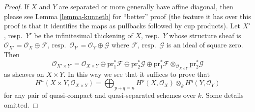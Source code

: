 \begin{proof}
If $X$ and $Y$ are separated or more generally have affine diagonal, then
please see Lemma \ref{lemma-kunneth} for ``better'' proof
(the feature it has over this proof is that it identifies the
maps as pullbacks followed by cup products).
Let $X'$, resp.\ $Y'$ be the infinitesimal thickening of $X$, resp.\ $Y$
whose structure sheaf is
$\mathcal{O}_{X'} = \mathcal{O}_X \oplus \mathcal{F}$,
resp.\ $\mathcal{O}_{Y'} = \mathcal{O}_Y \oplus \mathcal{G}$ where
$\mathcal{F}$, resp.\ $\mathcal{G}$ is an ideal of square zero.
Then
$$
\mathcal{O}_{X' \times Y'} =
\mathcal{O}_{X \times Y}
\oplus \text{pr}_1^*\mathcal{F}
\oplus \text{pr}_2^*\mathcal{G}
\oplus \text{pr}_1^*\mathcal{F}
\otimes_{\mathcal{O}_{X \times Y}} \text{pr}_2^*\mathcal{G}
$$
as sheaves on $X \times Y$. In this way we see that it suffices to
prove that
$$
H^n(X \times Y, \mathcal{O}_{X \times Y}) =
\bigoplus\nolimits_{p + q = n}
H^p(X, \mathcal{O}_X) \otimes_k H^q(Y, \mathcal{O}_Y)
$$
for any pair of quasi-compact and quasi-separated schemes over $k$.
Some details omitted.


\end{proof}
